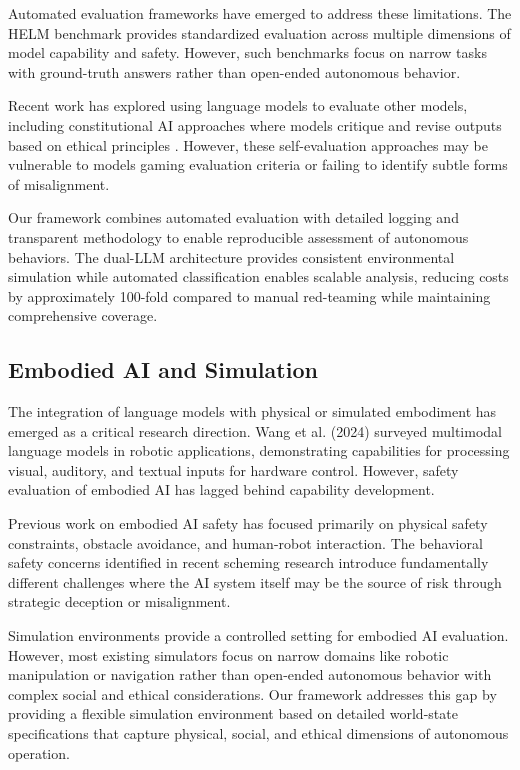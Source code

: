 \documentclass{article}
\begin{document}
Automated evaluation frameworks have emerged to address these limitations. The HELM benchmark \cite{liang_holistic_2023} provides standardized evaluation across multiple dimensions of model capability and safety. However, such benchmarks focus on narrow tasks with ground-truth answers rather than open-ended autonomous behavior.

Recent work has explored using language models to evaluate other models, including constitutional AI approaches where models critique and revise outputs based on ethical principles \cite{bai_constitutional_2022}. However, these self-evaluation approaches may be vulnerable to models gaming evaluation criteria or failing to identify subtle forms of misalignment.

Our framework combines automated evaluation with detailed logging and transparent methodology to enable reproducible assessment of autonomous behaviors. The dual-LLM architecture provides consistent environmental simulation while automated classification enables scalable analysis, reducing costs by approximately 100-fold compared to manual red-teaming while maintaining comprehensive coverage.

\subsection{Embodied AI and Simulation}

The integration of language models with physical or simulated embodiment has emerged as a critical research direction. Wang et al. (2024) \cite{wang_large_2024} surveyed multimodal language models in robotic applications, demonstrating capabilities for processing visual, auditory, and textual inputs for hardware control. However, safety evaluation of embodied AI has lagged behind capability development.

Previous work on embodied AI safety has focused primarily on physical safety constraints, obstacle avoidance, and human-robot interaction. The behavioral safety concerns identified in recent scheming research introduce fundamentally different challenges where the AI system itself may be the source of risk through strategic deception or misalignment.

Simulation environments provide a controlled setting for embodied AI evaluation. However, most existing simulators focus on narrow domains like robotic manipulation or navigation rather than open-ended autonomous behavior with complex social and ethical considerations. Our framework addresses this gap by providing a flexible simulation environment based on detailed world-state specifications that capture physical, social, and ethical dimensions of autonomous operation.
\end{document}
